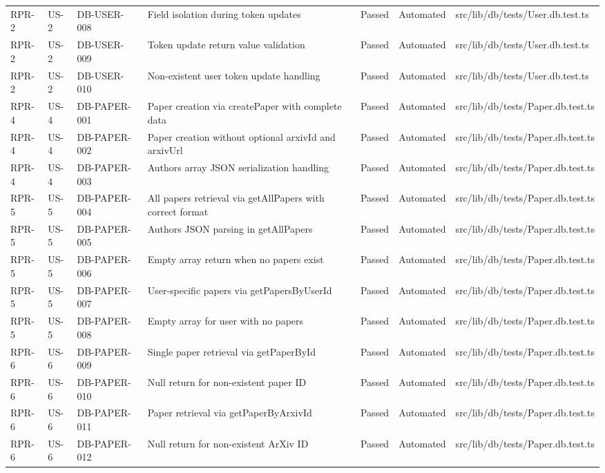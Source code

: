 \documentclass[12pt]{article}
\begin{document}
\begin{longtable}{|l|l|l|l|l|l|l|}
  RPR-2 & US-2 & DB-USER-008 & Field isolation during token updates & Passed & Automated & src/lib/db/tests/User.db.test.ts \\
  RPR-2 & US-2 & DB-USER-009 & Token update return value validation & Passed & Automated & src/lib/db/tests/User.db.test.ts \\
  RPR-2 & US-2 & DB-USER-010 & Non-existent user token update handling & Passed & Automated & src/lib/db/tests/User.db.test.ts \\
  \hline
  RPR-4 & US-4 & DB-PAPER-001 & Paper creation via createPaper with complete data & Passed & Automated & src/lib/db/tests/Paper.db.test.ts \\
  RPR-4 & US-4 & DB-PAPER-002 & Paper creation without optional arxivId and arxivUrl & Passed & Automated & src/lib/db/tests/Paper.db.test.ts \\
  RPR-4 & US-4 & DB-PAPER-003 & Authors array JSON serialization handling & Passed & Automated & src/lib/db/tests/Paper.db.test.ts \\
  RPR-5 & US-5 & DB-PAPER-004 & All papers retrieval via getAllPapers with correct format & Passed & Automated & src/lib/db/tests/Paper.db.test.ts \\
  RPR-5 & US-5 & DB-PAPER-005 & Authors JSON parsing in getAllPapers & Passed & Automated & src/lib/db/tests/Paper.db.test.ts \\
  RPR-5 & US-5 & DB-PAPER-006 & Empty array return when no papers exist & Passed & Automated & src/lib/db/tests/Paper.db.test.ts \\
  RPR-5 & US-5 & DB-PAPER-007 & User-specific papers via getPapersByUserId & Passed & Automated & src/lib/db/tests/Paper.db.test.ts \\
  RPR-5 & US-5 & DB-PAPER-008 & Empty array for user with no papers & Passed & Automated & src/lib/db/tests/Paper.db.test.ts \\
  RPR-6 & US-6 & DB-PAPER-009 & Single paper retrieval via getPaperById & Passed & Automated & src/lib/db/tests/Paper.db.test.ts \\
  RPR-6 & US-6 & DB-PAPER-010 & Null return for non-existent paper ID & Passed & Automated & src/lib/db/tests/Paper.db.test.ts \\
  RPR-6 & US-6 & DB-PAPER-011 & Paper retrieval via getPaperByArxivId & Passed & Automated & src/lib/db/tests/Paper.db.test.ts \\
  RPR-6 & US-6 & DB-PAPER-012 & Null return for non-existent ArXiv ID & Passed & Automated & src/lib/db/tests/Paper.db.test.ts \\

\end{longtable}
\end{document}
